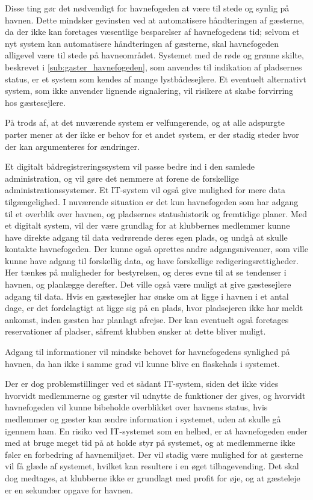 Disse ting gør det nødvendigt for havnefogeden at være til stede og synlig på havnen. Dette mindsker gevinsten ved at automatisere håndteringen af gæsterne, da der ikke kan foretages væsentlige besparelser af havnefogedens tid; selvom et nyt system kan automatisere håndteringen af gæsterne, skal havnefogeden alligevel være til stede på havneområdet. Systemet med de røde og grønne skilte, beskrevet i \cref{sub:gaster_havnefogeden}, som anvendes til indikation af pladsernes status, er et system som kendes af mange lystbådesejlere. Et eventuelt alternativt system, som ikke anvender lignende signalering, vil risikere at skabe forvirring hos gæstesejlere.

På trods af, at det nuværende system er velfungerende, og at alle adspurgte parter mener at der ikke er behov for et andet system, er der stadig steder hvor der kan argumenteres for ændringer.

Et digitalt bådregistreringssystem vil passe bedre ind i den samlede administration, og vil gøre det nemmere at forene de forskellige administrationssystemer. Et IT-system vil også give mulighed for mere data tilgængelighed. I nuværende situation er det kun havnefogeden som har adgang til et overblik over havnen, og pladsernes statushistorik og fremtidige planer. Med et digitalt system, vil der være grundlag for at klubbernes medlemmer kunne have direkte adgang til data vedrørende deres egen plads, og undgå at skulle kontakte havnefogeden. Der kunne også oprettes andre adgangsniveauer, som ville kunne have adgang til forskellig data, og have forskellige redigeringsrettigheder. Her tænkes på muligheder for bestyrelsen, og deres evne til at se tendenser i havnen, og planlægge derefter. Det ville også være muligt at give gæstesejlere adgang til data. Hvis en gæstesejler har ønske om at ligge i havnen i et antal dage, er det fordelagtigt at ligge sig på en plads, hvor pladsejeren ikke har meldt ankomst, inden gæsten har planlagt afrejse. Der kan eventuelt også foretages reservationer af pladser, såfremt klubben ønsker at dette bliver muligt.

Adgang til informationer vil mindske behovet for havnefogedens synlighed på havnen, da han ikke i samme grad vil kunne blive en flaskehals i systemet.

Der er dog problemstillinger ved et sådant IT-system, siden det ikke vides hvorvidt medlemmerne og gæster vil udnytte de funktioner der gives, og hvorvidt havnefogeden vil kunne bibeholde overblikket over havnens status, hvis medlemmer og gæster kan ændre information i systemet, uden at skulle gå igennem ham. En risiko ved IT-systemet som en helhed, er at havnefogeden ender med at bruge meget tid på at holde styr på systemet, og at medlemmerne ikke føler en forbedring af havnemiljøet. Der vil stadig være mulighed for at gæsterne vil få glæde af systemet, hvilket kan resultere i en øget tilbagevending. Det skal dog medtages, at klubberne ikke er grundlagt med profit for øje, og at gæsteleje er en sekundær opgave for havnen.
